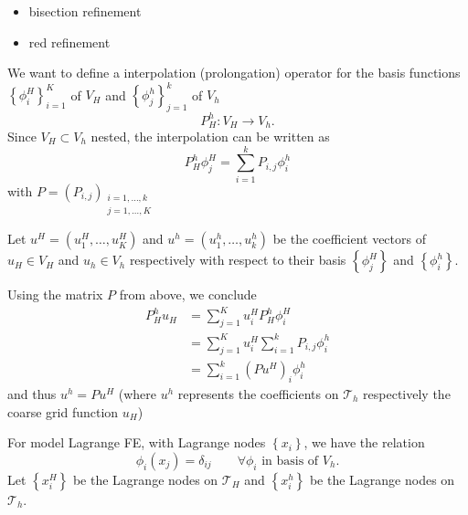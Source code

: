 \begin{exam}
\label{thm:refinementexamples}

\begin{itemize}
	\item bisection refinement
	\item red refinement
\end{itemize}
\end{exam}
We want to define a interpolation (prolongation) operator for the basis functions $\left\{ \phi _{i}^{H} \right\}_{i=1}^{K}$ of $V_{H}$ and $\left\{ \phi _{j}^{h} \right\} _{j=1}^{k}$ of $V_{h}$
\[
P_{H}^{h} \colon V_{H} \rightarrow V_{h}
.\] 
Since $V_{H} \subset V_{h}$ nested, the interpolation can be written as 
\[
P_{H}^{h}\phi _{j}^{H} = \sum_{i=1}^{k}{P_{i,j}\phi _{i}^{h}}
\] 
with $P = (P_{i,j})_{\substack{i=1, \ldots, k \\ j=1, \ldots, K}}$

Let $u^{H}=(u_{1}^{H}, \ldots , u_{K}^{H})$ and $u^{h}=(u_{1}^{h}, \ldots , u_{k}^{h})$ be the coefficient vectors of $u_{H} \in V_{H}$ and $u_{h} \in V_{h}$ respectively with respect to their basis $\left\{ \phi _{j}^{H} \right\} $ and $\left\{ \phi _{i}^{h} \right\} $.

Using the matrix $P$ from above, we conclude
\begin{align*}
	P_{H}^{h}u_{H} &= \sum_{j=1}^{K}{u_{i}^{H}P_{H}^{h}\phi _{i}^{H}} \\
				   &=\sum_{j=1}^{K}{u_{i}^{H}\sum_{i=1}^{k}{P_{i,j}\phi _{i}^{h}}} \\
				   &= \sum_{i=1}^{k}{(Pu^{H})_{i}\phi _{i}^{h}}
\end{align*}
and thus $u^{h} = Pu^{H}$ (where $u^{h}$ represents the coefficients on $\mathcal{T}_{h}$ respectively the coarse grid function $u_{H}$)

For model Lagrange FE, with Lagrange nodes $\left\{ x_{i} \right\} $, we have the relation
\[
	\phi _{i}(x_{j}) = \delta_{ij} \qquad \forall \phi _{i} \text{ in basis of } V_{h}
.\] 
Let $\left\{ x_{i}^{H} \right\} $ be the Lagrange nodes on $\mathcal{T}_{H}$ and $\left\{ x_{i}^{h} \right\} $ be the Lagrange nodes on $\mathcal{T}_{h}$.

